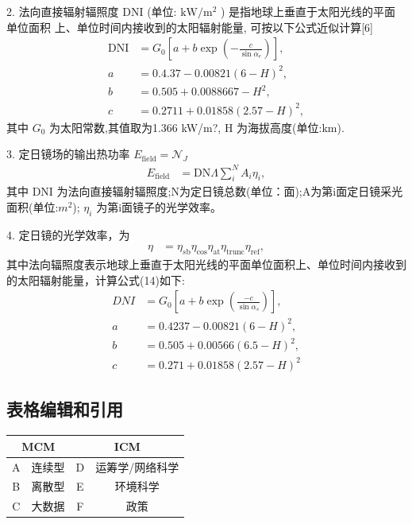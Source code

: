 \documentclass[a4paper,12pt]{article}
\begin{document}
2. 法向直接辐射辐照度 DNI (单位: \(\mathrm{kW} / \mathrm{m}^{2}\) ) 是指地球上垂直于太阳光线的平面单位面积
上、单位时间内接收到的太阳辐射能量, 可按以下公式近似计算[6]
\begin{align}
\mathrm{DNI} &= G_{0}\left[a + b \exp\left(-\frac{c}{\sin\alpha_{e}}\right)\right],\\ 
a &= 0.4.37 - 0.00821(6-H)^{2},\\ 
b &= 0.505 + 0.0088667-H^{2},\\ 
c &= 0.2711 + 0.01858(2.57-H)^{2},
\end{align}
其中 $G_{\mathrm{0}}$ 为太阳常数,其值取为1.366 kW/m?, H 为海拔高度(单位:km).

3. 定日镜场的输出热功率
$E_{\mathrm{field}} = \mathcal{N}_{J}$ 
\begin{align}
    E_{\mathrm{field}} &= \mathrm{DN}\Lambda\sum_{i}^{N}A_{i}\eta_{i},
\end{align}
其中 DNI 为法向直接辐射辐照度;N为定日镜总数(单位：面);A为第i面定日镜采光面积(单位:$m^{2}$);
$\eta_{i}$ 为第i面镜子的光学效率。

4. 定日镜的光学效率，为
\begin{align}
    \eta &= \eta_{s\mathrm{b}}\eta_{\mathrm{cos}}\eta_{\mathrm{at}}\eta_{\mathrm{trunc}}\eta_{\mathrm{ref}},
\end{align}
其中法向辐照度表示地球上垂直于太阳光线的平面单位面积上、单位时间内接收到的太阳辐射能量，计算公式(14)如下:
\begin{align}
    D N I &= G_{0}\left[a + b \exp\left(\frac{-c}{\sin \alpha_{s}}\right)\right], \\
    a &= 0.4237 - 0.00821(6 - H)^{2}, \\
    b &= 0.505 + 0.00566(6.5 - H)^{2}, \\
    c &= 0.271 + 0.01858(2.57 - H)^{2}
\end{align}

\subsection{表格编辑和引用}
    \begin{tabular}{|c|c|c|c|}
        \hline
        \multicolumn{2}{|c|}{MCM} & \multicolumn{2}{|c|}{ICM} \\
        \hline
        A & 连续型 & D & 运筹学/网络科学\\
        \hline
        B & 离散型 & E & 环境科学\\
        \hline
        C & 大数据 & F & 政策\\
        \hline
    \end{tabular}
    
\end{document}
